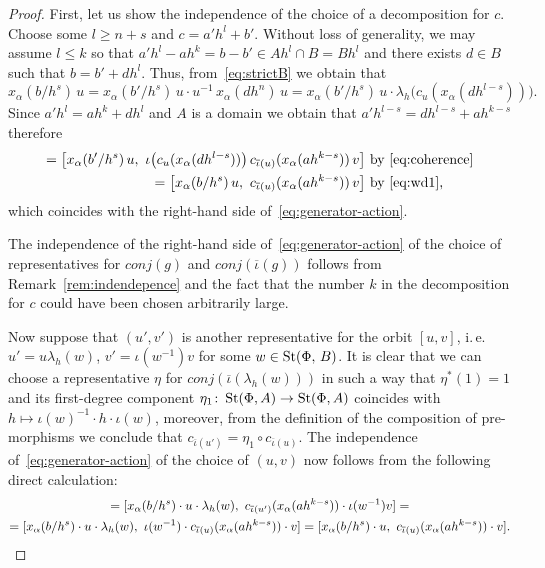 \documentclass[oneside, 11pt]{amsart} \pdfoutput=1
\begin{document}
\begin{proof}
First, let us show the independence of the choice of a decomposition for $c$. 
Choose some $l \geq n + s$ and $c = a' h^{l} + b'$. Without loss of generality, we may assume $l \leq k$ so that $a' h^{l} - a h^k = b - b' \in Ah^{l} \cap B = Bh^{l}$ and there exists $d \in B$ such that $b = b' + dh^{l}$. Thus, from~\eqref{eq:strictB} we obtain that
\begin{equation} \label{eq:wd1} \textstyle x_\alpha(b/{h^s})\, u = x_\alpha({b'}/{h^s})\, u \cdot u^{-1}\, x_\alpha(dh^{n})\, u =  x_\alpha({b'}/{h^s})\, u \cdot \lambda_h \bigl(c_u(x_\alpha(dh^{l-s}))\bigr). \end{equation}
Since $a'h^l = ah^k + dh^l$ and $A$ is a domain we obtain that $a'h^{l-s} = dh^{l-s} + ah^{k-s}$ therefore
\begin{align*}
[x_\alpha(b'/{h^s})\, u,\ c_{\overline{\iota}(u)}(x_\alpha(a'h^{l - s}))\, v\bigr] = \bigl[x_\alpha(b'/{h^s})\, u,\ \iota\bigl(c_{u}(x_\alpha(dh^{l-s}))\bigr)\, c_{\overline{\iota}(u)}(x_\alpha(ah^{k - s}))\, v\bigr] & \text{ by~\eqref{eq:coherence}} \\ = \bigl[x_\alpha(b/{h^s})\, u,\ c_{\overline{\iota}(u)}(x_\alpha(ah^{k - s}))\, v\bigr] &\text{ by~\eqref{eq:wd1},}
\end{align*}
 which coincides with the right-hand side of~\eqref{eq:generator-action}.

The independence of the right-hand side of~\eqref{eq:generator-action} of the choice of representatives for $conj(g)$ and $conj(\overline{\iota}(g))$ follows from Remark~\ref{rem:indendepence} and the fact that the number $k$ in the decomposition for $c$ could have been chosen arbitrarily large.

Now suppose that $(u', v')$ is another representative for the orbit $[u, v]$, i.\,e. $u' = u \lambda_h(w)$, $v' = \iota(w^{-1}) v$ for some $w \in \mathop{\mathrm{St}}\nolimits(\Phi,\,B)$. It is clear that we can choose a representative $\eta$ for $conj(\overline{\iota}(\lambda_h(w)))$ in such a way that $\eta^*(1)=1$ and its first-degree component $\eta_1 \colon \mathop{\mathrm{St}}\nolimits(\Phi, A) \to \mathop{\mathrm{St}}\nolimits(\Phi, A)$ coincides with $h \mapsto \iota(w)^{-1} \cdot h \cdot \iota(w)$, moreover, from the definition of the composition of pre-morphisms we conclude that $c_{\overline{\iota}(u')} =  \eta_1 \circ c_{\overline{\iota}(u)} $. The independence of~\eqref{eq:generator-action} of the choice of $(u, v)$ now follows from the following direct calculation:
\begin{multline*}
 [x_\alpha(b/h^s) \cdot u',\ c_{\overline{\iota}(u')}(x_\alpha(ah^{k-s}))\cdot v'] = [x_\alpha(b/h^s) \cdot u \cdot \lambda_h(w),\ c_{\overline{\iota}(u')}(x_\alpha(ah^{k-s}))\cdot \iota(w^{-1}) v] = \\
 = [x_\alpha(b/h^s) \cdot u \cdot \lambda_h(w),\ \iota(w^{-1}) \cdot c_{\overline{\iota}(u)}(x_\alpha(ah^{k-s}))\cdot v] 
 = [x_\alpha(b/h^s) \cdot u,\ c_{\overline{\iota}(u)}(x_\alpha(ah^{k-s}))\cdot v]. \qedhere
\end{multline*}
\end{proof}
\end{document}
